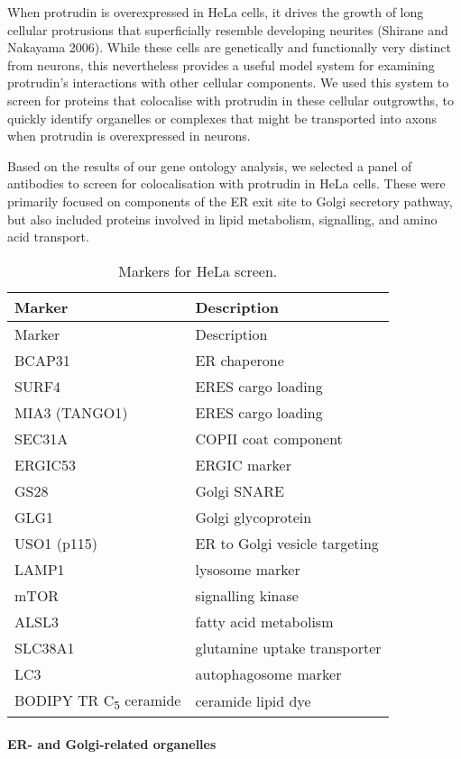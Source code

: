 \documentclass[
]{article}
\begin{document}
When protrudin is overexpressed in HeLa cells, it drives the growth of
long cellular protrusions that superficially resemble developing
neurites (Shirane and Nakayama 2006). While these cells are genetically
and functionally very distinct from neurons, this nevertheless provides
a useful model system for examining protrudin's interactions with other
cellular components. We used this system to screen for proteins that
colocalise with protrudin in these cellular outgrowths, to quickly
identify organelles or complexes that might be transported into axons
when protrudin is overexpressed in neurons.

Based on the results of our gene ontology analysis, we selected a panel
of antibodies to screen for colocalisation with protrudin in HeLa cells.
These were primarily focused on components of the ER exit site to Golgi
secretory pathway, but also included proteins involved in lipid
metabolism, signalling, and amino acid transport.

\begin{longtable}[]{@{}ll@{}}
\caption{Markers for HeLa screen.}\tabularnewline
\toprule()
Marker & Description \\
\midrule()
\endfirsthead
\toprule()
Marker & Description \\
\midrule()
\endhead
BCAP31 & ER chaperone \\
SURF4 & ERES cargo loading \\
MIA3 (TANGO1) & ERES cargo loading \\
SEC31A & COPII coat component \\
ERGIC53 & ERGIC marker \\
GS28 & Golgi SNARE \\
GLG1 & Golgi glycoprotein \\
USO1 (p115) & ER to Golgi vesicle targeting \\
LAMP1 & lysosome marker \\
mTOR & signalling kinase \\
ALSL3 & fatty acid metabolism \\
SLC38A1 & glutamine uptake transporter \\
LC3 & autophagosome marker \\
BODIPY TR C\textsubscript{5} ceramide & ceramide lipid dye \\
\bottomrule()
\end{longtable}

\hypertarget{er--and-golgi-related-organelles}{%
\paragraph{ER- and Golgi-related
organelles}\label{er--and-golgi-related-organelles}}
\end{document}
